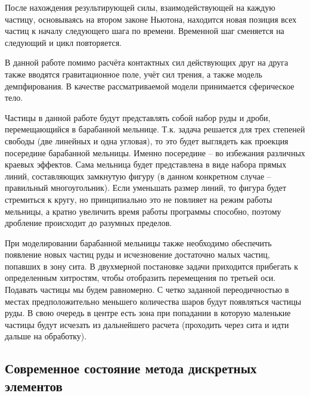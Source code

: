 \documentclass[utf8x, 14pt, oneside, a4paper]{article}
\begin{document}
После нахождения результирующей силы, взаимодействующей на каждую частицу, основываясь на втором законе Ньютона, находится новая позиция всех частиц к началу следующего шага по времени.
Временной шаг сменяется на следующий и цикл повторяется.

В данной работе помимо расчёта контактных сил действующих друг на друга также вводятся гравитационное поле, учёт сил трения, а также модель демпфирования. 
В качестве рассматриваемой модели принимается сферическое тело.

Частицы в данной работе будут представлять собой набор руды и дроби, перемещающийся в барабанной мельнице.
Т.к. задача решается для трех степеней свободы (две линейных и одна угловая), то это будет выглядеть как проекция посередине барабанной мельницы. Именно посередине -- во избежания различных краевых эффектов. Сама мельница будет представлена в виде набора прямых линий, составляющих замкнутую фигуру (в данном конкретном случае -- правильный многоугольник). Если уменьшать размер линий, то фигура будет стремиться к кругу, но принципиально это не повлияет на режим работы мельницы, а кратно увеличить время работы программы способно, поэтому дробление происходит до разумных пределов.

При моделировании барабанной мельницы также необходимо обеспечить появление новых частиц руды и исчезновение достаточно малых частиц, попавших в зону сита.
В двухмерной постановке задачи приходится прибегать к определенным хитростям, чтобы отобразить перемещения по третьей оси.
Подавать частицы мы будем равномерно.
С четко заданной переодичностью в местах предположительно меньшего количества шаров будут появляться частицы руды.
В свою очередь в центре есть зона при попадании в которую маленькие частицы будут исчезать из дальнейшего расчета (проходить через сита и идти дальше на обработку).


\subsection*{Современное состояние метода дискретных элементов}
\end{document}
